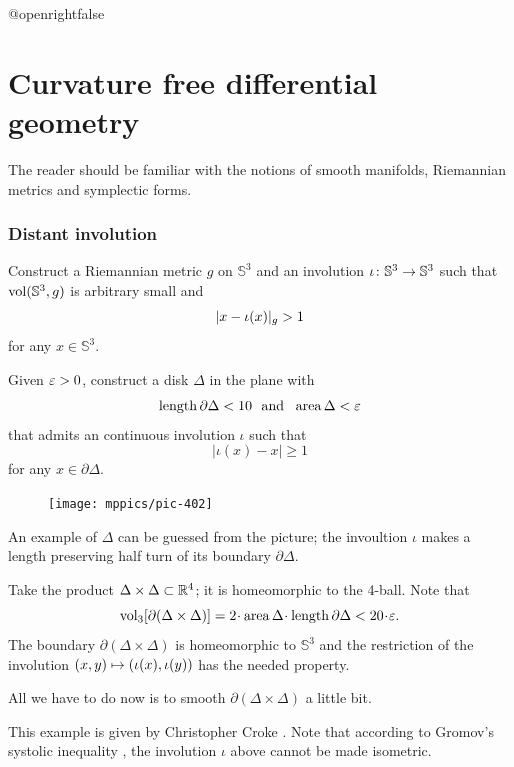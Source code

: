 \csname @openrightfalse\endcsname
\chapter{Curvature free differential geometry}

The reader should be familiar 
with the notions of smooth manifolds, 
Riemannian metrics and symplectic forms.

\subsection*{Distant involution}
\label{Distant involution}

\begin{pr}
Construct a Riemannian metric $g$ on $\mathbb{S}^3$ and an involution $\iota\:\mathbb{S}^3\z\to\mathbb{S}^3$ such that $\operatorname{\rm vol}\nolimits (\mathbb{S}^3,g)$ is arbitrary small and 
\[|x\z-\iota(x)|_g>1\]
 for any $x\in\mathbb{S}^3$.
\end{pr}


Given $\varepsilon>0$, construct a disk $\Delta$ in the plane with 
\[\operatorname{\rm length}\partial \Delta<10\ \ \text{and}\ \ \operatorname{\rm area}\nolimits \Delta<\varepsilon\]
that admits an continuous involution $\iota$ such that 
\[|\iota(x)-x|\ge 1\]
for any $x\in\partial \Delta$.

\begin{figure}
\vskip-0mm
\centering
\texttt{[image: mppics/pic-402]}
\end{figure}

An example of $\Delta$ can be guessed from the picture;
the invoultion $\iota$ makes a length preserving half turn of its boundary $\partial \Delta$.


Take the product $\Delta\times \Delta\subset \mathbb{R}^4$;
it is homeomorphic to the 4-ball.
Note that 
$$\vol_3[\partial(\Delta\times \Delta)]=2\cdot\area \Delta\cdot\length \partial \Delta<20\cdot\eps.$$
The boundary $\partial(\Delta\times \Delta)$ is homeomorphic to $\mathbb{S}^3$
and the restriction of the involution $(x,y)\z\mapsto (\iota(x),\iota(y))$ has the needed property.

All we have to do now is to smooth $\partial(\Delta\times \Delta)$ a little bit.
\qeds

This example is given by Christopher Croke \cite{croke}.
Note that according to Gromov's systolic inequality \cite{gromov-filling}, 
the involution $\iota$ above cannot be made isometric.

